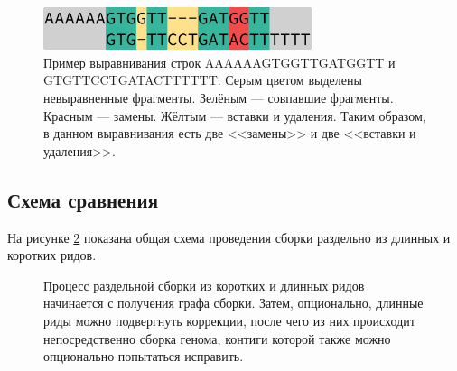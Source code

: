 \documentclass[14pt]{matmex-diploma-custom}
\begin{document}
\begin{figure}[h]
    \centering
    \includegraphics[width=0.7\textwidth]{alignment.eps}
    \caption{Пример выравнивания строк AAAAAAGTGGTTGATGGTT и GTGTTCCTGATACTTTTTT. Серым цветом выделены невыравненные фрагменты. Зелёным --- совпавшие фрагменты. Красным --- замены. Жёлтым --- вставки и удаления. Таким образом, в данном выравнивания есть две <<замены>> и две <<вставки и удаления>>.}
    \label{fig:alignment}
\end{figure}

\subsection{Схема сравнения}
На рисунке \ref{fig:common_pipeline} показана общая схема проведения сборки раздельно из длинных и коротких ридов.

\begin{figure}[h]
    \centering
{}
\caption{Процесс раздельной сборки из коротких и длинных ридов начинается с получения графа сборки. Затем, опционально, длинные риды можно подвергнуть коррекции, после чего из них происходит непосредственно сборка генома, контиги которой также можно опционально попытаться исправить.}
\label{fig:common_pipeline}
\end{figure}
\end{document}
